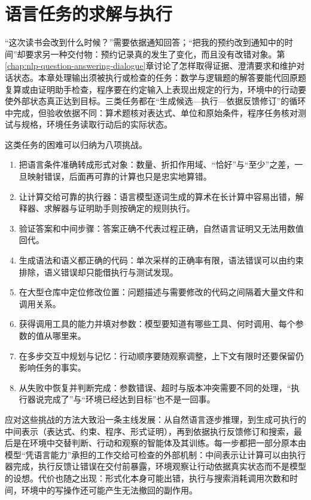 \chapter{语言任务的求解与执行}
\label{chap:nlp-solving-and-execution}

“这次读书会改到什么时候？”需要依据通知回答；“把我的预约改到通知中的时间”却要求另一种交付物：预约记录真的发生了变化，而且没有改错对象。第\ref{chap:nlp-question-answering-dialogue}章讨论了怎样取得证据、澄清要求和维护对话状态。本章处理输出须被执行或检查的任务：数学与逻辑题的解答要能代回原题复算或由证明助手检查，程序要在约定输入上表现出规定的行为，环境中的行动要使外部状态真正达到目标。三类任务都在“生成候选—执行—依据反馈修订”的循环中完成，但验收依据不同：算术题核对表达式、单位和原始条件，程序任务核对测试与规格，环境任务读取行动后的实际状态。

这类任务的困难可以归纳为八项挑战。
\begin{enumerate}
  \item 把语言条件准确转成形式对象：数量、折扣作用域、“恰好”与“至少”之差，一旦映射错误，后面再可靠的计算也只是忠实地算错。
  \item 让计算交给可靠的执行器：语言模型逐词生成的算术在长计算中容易出错，解释器、求解器与证明助手则按确定的规则执行。
  \item 验证答案和中间步骤：答案正确不代表过程正确，自然语言证明又无法用数值回代。
  \item 生成语法和语义都正确的代码：单次采样的正确率有限，语法错误可以由约束排除，语义错误却只能借执行与测试发现。
  \item 在大型仓库中定位修改位置：问题描述与需要修改的代码之间隔着大量文件和调用关系。
  \item 获得调用工具的能力并填对参数：模型要知道有哪些工具、何时调用、每个参数的值从哪里来。
  \item 在多步交互中规划与记忆：行动顺序要随观察调整，上下文有限时还要保留仍影响任务的事实。
  \item 从失败中恢复并判断完成：参数错误、超时与版本冲突需要不同的处理，“执行器说完成了”与“环境已经达到目标”也不是一回事。
\end{enumerate}

应对这些挑战的方法大致沿一条主线发展：从自然语言逐步推理，到生成可执行的中间表示（表达式、约束、程序、形式证明），再到依据执行反馈修订和搜索，最后是在环境中交替判断、行动和观察的智能体及其训练。每一步都把一部分原本由模型“凭语言能力”承担的工作交给可检查的外部机制：中间表示让计算可以由执行器完成，执行反馈让错误在交付前暴露，环境观察让行动依据真实状态而不是模型的设想。代价也随之出现：形式化本身可能出错，执行与搜索消耗调用次数和时间，环境中的写操作还可能产生无法撤回的副作用。

